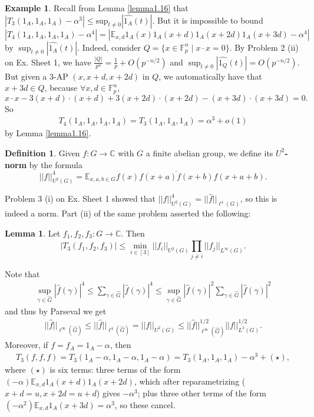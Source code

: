 \documentclass{article}
\theoremstyle{definition}
\newtheorem{lemma}[theorem]{Lemma}
\newtheorem{example}[theorem]{Example}
\newtheorem{defn}[theorem]{Definition}
\begin{document}
\begin{example}\label{example4.4}
    Recall from Lemma \ref{lemma1.16} that $|T_3(1_A,1_A,1_A) - \alpha^3| \le \text{sup}_{t\neq 0}|\widehat{1_A}(t)|$. But it is impossible to bound $|T_4(1_A,1_A,1_A,1_A) - \alpha^4| = |\mathbb{E}_{x,d} 1_A(x)1_A(x+d)1_A(x+2d)1_A(x+3d)-\alpha^4|$ by $\sup_{t\neq 0}|\widehat{1_A}(t)|$. Indeed, consider $Q = \{x \in \mathbb{F}_p^n \mid x\cdot x = 0\}$. By Problem 2 (ii) on Ex. Sheet 1, we have $\frac{\left|Q\right|}{p^n}= \frac{1}{p}+O(p^{-n/2})$ and $\sup_{t\neq 0} \left|\widehat{1_Q}(t)\right|=O(p^{-n/2})$. But given a 3-AP $(x,x+d,x+2d)$ in $Q$, we automatically have that $x+3d \in Q$, because $\forall x,d \in \mathbb{F}_p^n$, \[
    x\cdot x - 3(x+d)\cdot (x+d) + 3(x+2d)\cdot (x+2d) - (x+3d)\cdot (x+3d) = 0.
    \]
    So 
    \begin{align*}
        T_4(1_A,1_A,1_A,1_A) = T_3(1_A,1_A,1_A) = \alpha^3 + o(1)
    \end{align*}
    by Lemma \ref{lemma1.16}.
\end{example}
\begin{defn}
    Given $f : G \to \mathbb{C}$ with $G$ a finite abelian group, we define its \textbf{$U^2$-norm} by the formula \[
    ||f||_{U^2(G)}^4 = \mathbb{E}_{x,a,b \in G}f(x)\overline{f(x+a)f(x+b)}f(x+a+b).
    \]
\end{defn}
Problem 3 (i) on Ex. Sheet 1 showed that $||f||_{U^2(G)}^4 = ||\widehat{f}||_{\ell^4(G)}$, so this is indeed a norm. Part (ii) of the same problem asserted the following:
\begin{lemma}\label{lemma4.6}
    Let $f_1,f_2,f_3 : G \to \mathbb{C}$. Then 
    \[
    \left|T_3(f_1,f_2,f_3)\right| \le \min_{i \in [3]}||f_i||_{U^2(G)}\prod_{j \neq i}^{} ||f_j||_{L^{\infty}(G)}.
    \] 
\end{lemma}
Note that 
\begin{align*}
    \sup_{\gamma \in \widehat{G}} |\widehat{f}(\gamma)|^4 \le \sum_{\gamma \in \widehat{G}}^{} |\widehat{f}(\gamma)|^4 \le \sup_{\gamma \in \widehat{G}} |\widehat{f}(\gamma)|^2 \sum_{\gamma \in \widehat{G}}^{} |\widehat{f}(\gamma)|^2
\end{align*}
and thus by Parseval we get
\begin{align*}
    ||\widehat{f}||_{\ell^{\infty}(\widehat{G})} \le ||\widehat{f}||_{\ell^4(\widehat{G})} = ||f||_{U^2(G)} \le ||\widehat{f}||^{1/2}_{\ell^{\infty}(\widehat{G})} ||f||^{1/2}_{L^2(G)}.
\end{align*}
Moreover, if $f=f_A = 1_A - \alpha$, then
\begin{align*}
    T_3(f,f,f) = T_3(1_A-\alpha,1_A-\alpha,1_A-\alpha) = T_3(1_A,1_A,1_A) - \alpha^3 + (\star),
\end{align*}
where $(\star)$ is six terms: three terms of the form $(-\alpha)\mathbb{E}_{x,d}1_A(x+d)1_A(x+2d)$, which after reparametrizing ($x+d=u,x+2d=u+d$) gives $-\alpha^3$; plus three other terms of the form $(-\alpha^2)\mathbb{E}_{x,d}1_A(x+3d) = \alpha^3$, so these cancel.
\vspace{1mm}
 
\end{document}
